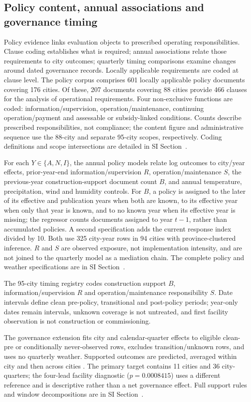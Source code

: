 \subsection{Policy content, annual associations and governance timing}
Policy evidence links evaluation objects to prescribed operating responsibilities. Clause coding establishes what is required; annual associations relate those requirements to city outcomes; quarterly timing comparisons examine changes around dated governance records. Locally applicable requirements are coded at clause level.  The policy corpus comprises 601 locally applicable policy documents covering 176 cities. Of these, 207 documents covering 88 cities provide 466 clauses for the analysis of operational requirements.  Four non-exclusive functions are coded: information/supervision, operation/maintenance, continuing operation/payment and assessable or subsidy-linked conditions.  Counts describe prescribed responsibilities, not compliance; the content figure and administrative sequence use the 88-city and separate 95-city scopes, respectively. Coding definitions and scope intersections are detailed in SI Section~.

For each $Y\in\{A,N,I\}$, the annual policy models relate log outcomes to city/year effects, prior-year-end information/supervision $R$, operation/maintenance $S$, the previous-year construction-support document count $B$, and annual temperature, precipitation, wind and humidity controls.  For $B$, a policy is assigned to the later of its effective and publication years when both are known, to its effective year when only that year is known, and to no known year when its effective year is missing; the regressor counts documents assigned to year $t-1$, rather than accumulated policies. A second specification adds the current response index divided by 10.  Both use 325 city-year rows in 94 cities with province-clustered inference.  $R$ and $S$ are observed exposure, not implementation intensity, and are not joined to the quarterly model as a mediation chain. The complete policy and weather specifications are in SI Section~.

The 95-city timing registry codes construction support $B$, information/supervision $R$ and operation/maintenance responsibility $S$.  Date intervals define clean pre-policy, transitional and post-policy periods; year-only dates remain intervals, unknown coverage is not untreated, and first facility observation is not construction or commissioning.

The governance extension fits city and calendar-quarter effects to eligible clean-pre or conditionally never-observed rows, excludes transition/unknown rows, and uses no quarterly weather.  Supported outcomes are predicted, averaged within city and then across cities \citep{borusyak2024}.  The primary target contains 11 cities and 36 city-quarters; the four-lead facility diagnostic ($p=0.0008415$) uses a different reference and is descriptive rather than a net governance effect.  Full support rules and window decompositions are in SI Section~.
